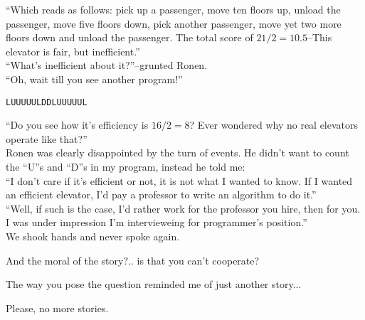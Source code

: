 \documentclass[11pt,a4paper,oneside]{memoir}
\begin{document}
\begin{description}[itemsep=1ex,leftmargin=1cm]
  ``Which reads as follows: pick up a passenger, move ten floors up, unload
  the passenger, move five floors down, pick another passenger, move yet
  two more floors down and unload the passenger. The total score of
  $21/2=10.5$--This elevator is fair, but inefficient.''\\
  ``What's inefficient about it?''--grunted Ronen.\\
  ``Oh, wait till you see another program!''\\
\begin{verbatim}
LUUUUULDDLUUUUUL
\end{verbatim}
  ``Do you see how it's efficiency is $16/2=8$? Ever wondered why no real
  elevators operate like that?''\\
  Ronen was clearly disappointed by the turn of events. He didn't want to
  count the ``U''s and ``D''s in my program, instead he told me:\\
  ``I don't care if it's efficient or not, it is not what I wanted to know.
  If I wanted an efficient elevator, I'd pay a professor to write an algorithm
  to do it.''\\
  ``Well, if such is the case, I'd rather work for the professor you hire,
  then for you. I was under impression I'm intervieweing for programmer's
  position.''\\
  We shook hands and never spoke again.

\item[Ronen] And the moral of the story?.. is that you can't cooperate?

\item[Oleg] The way you pose the question reminded me of just another
  story...

\item[Ronen] Please, no more stories.


\end{description}
\end{document}
